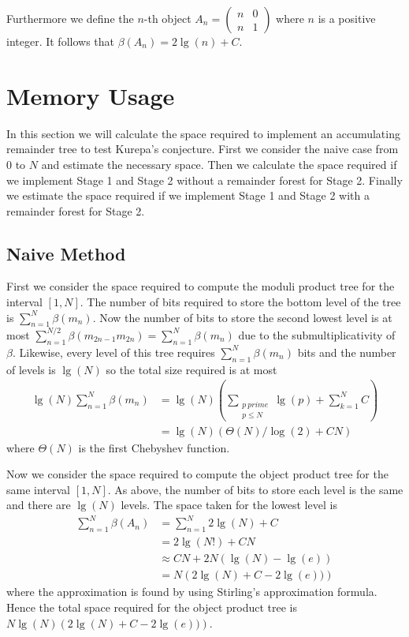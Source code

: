 \documentclass[10pt]{article}
\begin{document}
Furthermore we define the $n$-th object $A_n=\begin{pmatrix} n & 0\\
n & 1\end{pmatrix}$ where $n$ is a positive integer. It follows that $\beta(A_n)=2\lg(n)+C$.  

\section{Memory Usage}

In this section we will calculate the space required to implement an accumulating remainder tree to test Kurepa's conjecture. First we consider the naive case from $0$ to $N$ and estimate the necessary space. Then we calculate the space required if we implement Stage 1 and Stage 2 without a remainder forest for Stage 2. Finally we estimate the space required if we implement Stage 1 and Stage 2 with a remainder forest for Stage 2.

\subsection{Naive Method}

First we consider the space required to compute the moduli product tree for the interval $[1,N]$. The number of bits required to store the bottom level of the tree is $\sum_{n=1}^{N}\beta(m_n)$. Now the number of bits to store the second lowest level is at most $\sum_{n=1}^{N/2}\beta(m_{2n-1}m_{2n})=\sum_{n=1}^{N}\beta(m_n)$ due to the submultiplicativity of $\beta$. Likewise, every level of this tree requires $\sum_{n=1}^{N}\beta(m_n)$ bits and the number of levels is $\lg(N)$ so the total size required is at most \begin{align*}\lg(N)\sum_{n=1}^{N}\beta(m_n)&=\lg(N)\left( \sum_{\substack{p \ prime \\ p\leq N}} \lg(p)+\sum_{k=1}^{N}C\right)\\ &= \lg(N)\left(\Theta(N)/\log(2)+CN\right)  \end{align*} where $\Theta(N)$ is the first Chebyshev function.   

Now we consider the space required to compute the object product tree for the same interval $[1,N]$. As above, the number of bits to store each level is the same and there are $\lg(N)$ levels. The space taken for the lowest level is \begin{align*}\sum_{n=1}^{N}\beta(A_n)&=\sum_{n=1}^{N} 2\lg(N)+C\\
&=2\lg(N!)+CN\\ &\approx CN+2N\left(\lg(N)-\lg(e)\right) \\ &=N\left(2\lg(N)+C-2\lg(e))\right) \end{align*} where the approximation is found by using Stirling's approximation formula. Hence the total space required for the object product tree is $N\lg(N)\left(2\lg(N)+C-2\lg(e))\right)$.
\end{document}
